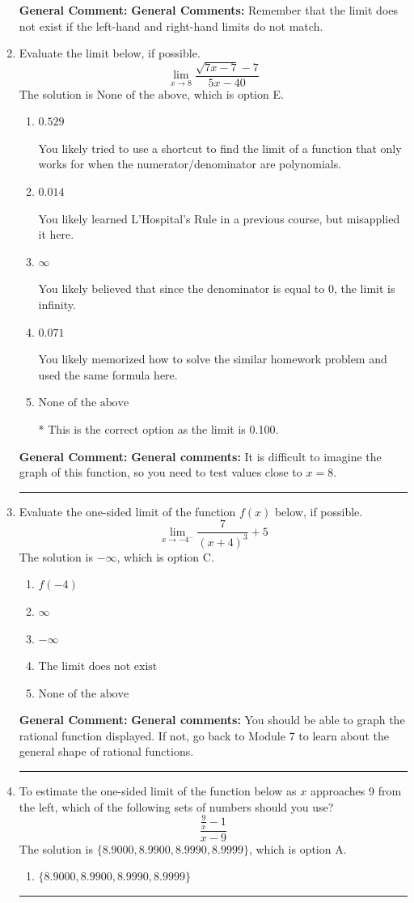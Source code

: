 \documentclass{extbook}[14pt]
\newcommand{\litem}[1]{\item #1

\rule{\textwidth}{0.4pt}}
\begin{document}
\begin{enumerate}
{\textbf{General Comment:} \textbf{General Comments:} Remember that the limit does not exist if the left-hand and right-hand limits do not match.
}
\litem{
Evaluate the limit below, if possible.
\[ \lim_{x \rightarrow 8} \frac{\sqrt{7x - 7} - 7}{5x - 40} \]The solution is \( \text{None of the above} \), which is option E.\begin{enumerate}[label=\Alph*.]
\item \( 0.529 \)

You likely tried to use a shortcut to find the limit of a function that only works for when the numerator/denominator are polynomials.
\item \( 0.014 \)

You likely learned L'Hospital's Rule in a previous course, but misapplied it here.
\item \( \infty \)

You likely believed that since the denominator is equal to 0, the limit is infinity.
\item \( 0.071 \)

You likely memorized how to solve the similar homework problem and used the same formula here.
\item \( \text{None of the above} \)

* This is the correct option as the limit is 0.100.
\end{enumerate}

\textbf{General Comment:} \textbf{General comments:} It is difficult to imagine the graph of this function, so you need to test values close to $x = 8$.
}
\litem{
Evaluate the one-sided limit of the function $f(x)$ below, if possible.
\[ \lim_{x \rightarrow -4^-} \frac{7}{(x+4)^3}+5 \]The solution is \( -\infty \), which is option C.\begin{enumerate}[label=\Alph*.]
\item \( f(-4) \)


\item \( \infty \)


\item \( -\infty \)


\item \( \text{The limit does not exist} \)


\item \( \text{None of the above} \)


\end{enumerate}

\textbf{General Comment:} \textbf{General comments:} You should be able to graph the rational function displayed. If not, go back to Module 7 to learn about the general shape of rational functions.
}
\litem{
To estimate the one-sided limit of the function below as $x$ approaches 9 from the left, which of the following sets of numbers should you use?
\[ \frac{\frac{9}{x} - 1}{x - 9} \]The solution is \( \{ 8.9000, 8.9900, 8.9990, 8.9999 \} \), which is option A.\begin{enumerate}[label=\Alph*.]
\item \( \{ 8.9000, 8.9900, 8.9990, 8.9999 \} \)


\end{enumerate}}
\end{enumerate}
\end{document}
